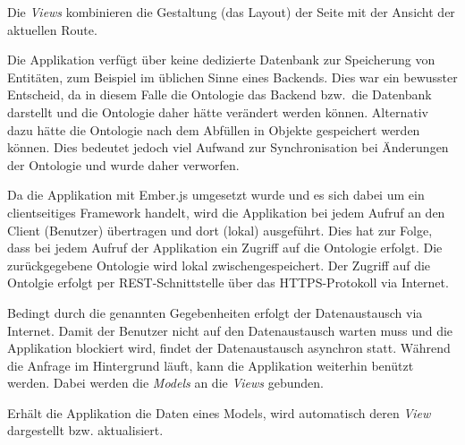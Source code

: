 Die \textit{Views} kombinieren die Gestaltung (das Layout) der Seite mit der Ansicht der aktuellen Route.

Die Applikation verfügt über keine dedizierte Datenbank zur Speicherung von Entitäten, zum Beispiel im üblichen Sinne eines Backends. Dies war ein bewusster Entscheid, da in diesem Falle die Ontologie das Backend bzw.\ die Datenbank darstellt und die Ontologie daher hätte verändert werden können. Alternativ dazu hätte die Ontologie nach dem Abfüllen in Objekte gespeichert werden können. Dies bedeutet jedoch viel Aufwand zur Synchronisation bei Änderungen der Ontologie und wurde daher verworfen.

Da die Applikation mit Ember.js umgesetzt wurde und es sich dabei um ein clientseitiges Framework handelt, wird die Applikation bei jedem Aufruf an den Client (Benutzer) übertragen und dort (lokal) ausgeführt. Dies hat zur Folge, dass bei jedem Aufruf der Applikation ein Zugriff auf die Ontologie erfolgt. Die zurückgegebene Ontologie wird lokal zwischengespeichert. Der Zugriff auf die Ontolgie erfolgt per REST-Schnittstelle über das HTTPS-Protokoll via Internet.

Bedingt durch die genannten Gegebenheiten erfolgt der Datenaustausch via Internet. Damit der Benutzer nicht auf den Datenaustausch warten muss und die Applikation blockiert wird, findet der Datenaustausch asynchron statt. Während die Anfrage im Hintergrund läuft, kann die Applikation weiterhin benützt werden. Dabei werden die \textit{Models} an die \textit{Views} gebunden. 

Erhält die Applikation die Daten eines Models, wird automatisch deren \textit{View} dargestellt bzw. aktualisiert.
